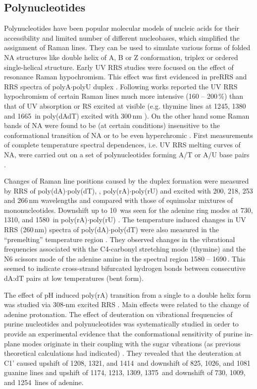 \subsection{Polynucleotides}

Polynucleotides have been popular molecular models of nucleic acids for their
accessibility and limited number of different nucleobases, which simplified the
assignment of Raman lines.
They can be used to simulate various forms of folded NA structures like double
helix of A, B or Z conformation, triplex or ordered single-helical structure.
Early UV RRS studies were focused on the effect of resonance Raman
hypochromism.
This effect was first evidenced in preRRS and RRS spectra of polyA$\cdot$polyU
duplex
\parencite{Pezolet1975}.
Following works reported the UV RRS hypochromism of certain Raman lines much
more intensive (160 -- 200\,\%) than that of UV absorption or RS excited at
visible (e.g. thymine lines at 1245, 1380 and 1665\,\icm{} in poly(dAdT)
excited with 300\,nm
\cite{Chinsky1982a}).
On the other hand some Raman bands of NA were found to be (at certain
conditions) insensitive to the conformational transition of NA or to be even
hyperchromic
\parencite{Chinsky1980}.
First measurements of complete temperature spectral dependences, i.e. UV RRS
melting curves of NA, were carried out on a set of polynucleotides forming A/T
or A/U base pairs
\parencite{Jolles1985}.

Changes of Raman line positions caused by the duplex formation were measured by
RRS of
	poly(dA)$\cdot$poly(dT),
	,
	poly(rA)$\cdot$poly(rU)
	and 
excited with 200, 218, 253 and 266\,nm wavelengths and compared with those of
equimolar mixtures of mononucleotides.
Downshift up to 10\,\icm{} was seen for the adenine ring modes at 730, 1310,
and 1580\,\icm{} in poly(rA)$\cdot$poly(rU)
\parencite{Grygon1990}.
The temperature induced changes in UV RRS (260\,nm) spectra of
poly(dA)$\cdot$poly(dT) were also measured in the “premelting” temperature
region
\parencite{Chan1997}.
They observed changes in the vibrational frequencies associated with the
C4-carbonyl stretching mode (thymine) and the N6 scissors mode of the adenine
amine in the spectral region 1580 -- 1690\,\icm{}.
This seemed to indicate cross-strand bifurcated hydrogen bonds between
consecutive dA:dT pairs at low temperatures (bent form).

The effect of pH induced poly(rA) transition from a single to a double helix
form was studied via 308-nm excited RRS
\parencite{Gfrorer1989}.
Main effects were related to the change of adenine protonation.
The effect of deuteration on vibrational frequencies of purine nucleotides and
polynucleotides was systematically studied in order to provide an experimental
evidence that the conformational sensitivity of purine in-plane modes originate
in their coupling with the sugar vibrations (as previous theoretical
calculations had indicated)
\parencite{Toyama1993}.
They revealed that the deuteration at C1' caused upshift of 1208, 1321, and
1414\,\icm{} and downshift of 825, 1026, and 1081\,\icm{} guanine lines and
upshift of 1174, 1213, 1309, 1375\,\icm{} and downshift of 730, 1009, and
1254\,\icm{} lines of adenine.


